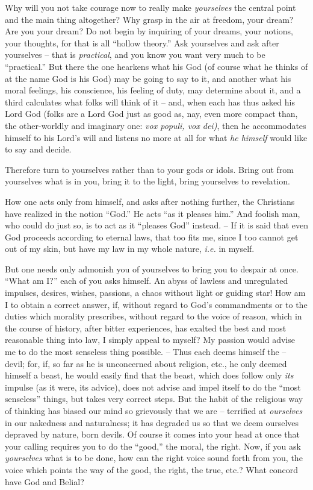 \documentclass[12pt,a4paper]{book}
\begin{document}
Why will you not take courage now to really make \textit{yourselves} the 
central point and the main thing altogether? Why grasp in the air at freedom, 
your dream? Are you your dream? Do not begin by inquiring of your dreams, your 
notions, your thoughts, for that is all ``hollow theory.'' Ask yourselves 
and ask after yourselves -- that is \textit{practical}, and you know you want 
very much to be ``practical.'' But there the one hearkens what his God (of 
course what he thinks of at the name God is his God) may be going to say to 
it, and another what his moral feelings, his conscience, his feeling of duty, 
may determine about it, and a third calculates what folks will think of it -- 
and, when each has thus asked his Lord God (folks are a Lord God just as good 
as, nay, even more compact than, the other-worldly and imaginary one: 
\textit{vox populi, vox dei)}, then he accommodates himself to his Lord's will 
and listens no more at all for what \textit{he himself} would like to say and 
decide.

Therefore turn to yourselves rather than to your gods or idols. Bring out from 
yourselves what is in you, bring it to the light, bring yourselves to 
revelation.

How one acts only from himself, and asks after nothing further, the Christians 
have realized in the notion ``God.'' He acts ``as it pleases him.'' And 
foolish man, who could do just so, is to act as it ``pleases God'' instead. 
-- If it is said that even God proceeds according to eternal laws, that too 
fits me, since I too cannot get out of my skin, but have my law in my whole 
nature, \textit{i.e.} in myself.

But one needs only admonish you of yourselves to bring you to despair at once. 
``What am I?'' each of you asks himself. An abyss of lawless and unregulated 
impulses, desires, wishes, passions, a chaos without light or guiding star! 
How am I to obtain a correct answer, if, without regard to God's commandments 
or to the duties which morality prescribes, without regard to the voice of 
reason, which in the course of history, after bitter experiences, has exalted 
the best and most reasonable thing into law, I simply appeal to myself? My 
passion would advise me to do the most senseless thing possible. -- Thus each 
deems himself the -- devil; for, if, so far as he is unconcerned about 
religion, etc., he only deemed himself a beast, he would easily find that the 
beast, which does follow only \textit{its} impulse (as it were, its advice), 
does not advise and impel itself to do the ``most senseless'' things, but 
takes very correct steps. But the habit of the religious way of thinking has 
biased our mind so grievously that we are -- terrified at \textit{ourselves} 
in our nakedness and naturalness; it has degraded us so that we deem ourselves 
depraved by nature, born devils. Of course it comes into your head at once 
that your calling requires you to do the ``good,'' the moral, the right. 
Now, if you ask \textit{yourselves} what is to be done, how can the right 
voice sound forth from you, the voice which points the way of the good, the 
right, the true, etc.? What concord have God and Belial?
\end{document}
